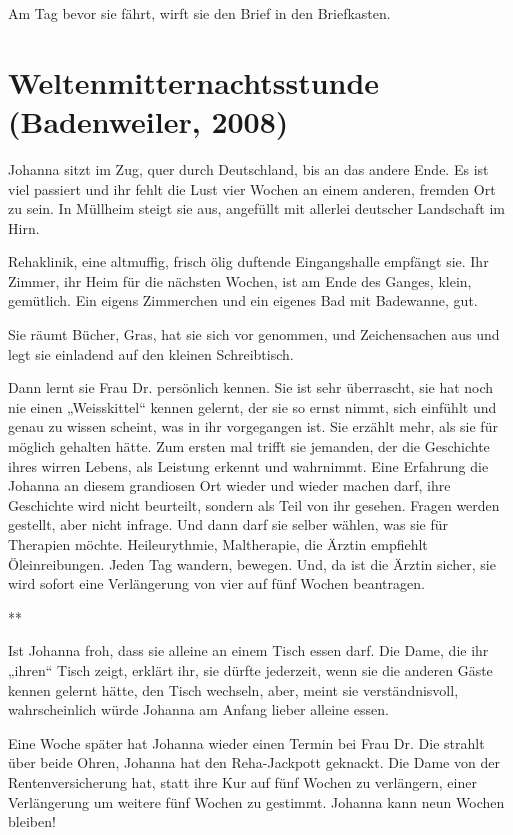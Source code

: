 \documentclass[10pt,titlepage,a5paper]{book}
\newcommand{\sterne}{\par{\centering ***\par}}
\begin{document}
Am Tag bevor sie fährt, wirft sie den Brief in den Briefkasten. 



\section*{ Weltenmitternachtsstunde (Badenweiler, 2008)}



Johanna sitzt im Zug, quer durch Deutschland, bis an das andere Ende. Es ist viel passiert und ihr fehlt die Lust vier Wochen an einem anderen, fremden Ort zu sein. In Müllheim steigt sie aus, angefüllt mit allerlei deutscher Landschaft im Hirn.

Rehaklinik, eine altmuffig, frisch ölig duftende Eingangshalle em\-pfängt sie. Ihr Zimmer, ihr Heim für die nächsten Wochen, ist am Ende des Ganges, klein, gemütlich. Ein eigens Zimmerchen und ein eigenes Bad mit Badewanne, gut.

Sie räumt Bücher, Gras, hat sie sich vor genommen, und Zeichensachen aus und legt sie einladend auf den kleinen Schreibtisch.

Dann lernt sie Frau Dr. persönlich kennen. Sie ist sehr überrascht, sie hat noch nie einen „Weisskittel“ kennen gelernt, der sie so ernst nimmt, sich einfühlt und genau zu wissen scheint, was in ihr vorgegangen ist. Sie erzählt mehr, als sie für möglich gehalten hätte. Zum ersten mal trifft sie jemanden, der die Geschichte ihres wirren Lebens, als Leistung erkennt und wahrnimmt. Eine Erfahrung die Johanna an diesem grandiosen Ort wieder und wieder machen darf, ihre Geschichte wird nicht beurteilt, sondern als Teil von ihr gesehen. Fragen werden gestellt, aber nicht infrage. Und dann darf sie selber wählen, was sie für Therapien möchte. Heileurythmie, Maltherapie, die Ärztin empfiehlt Öleinreibungen. Jeden Tag wandern, bewegen. Und, da ist die Ärztin sicher, sie wird sofort eine Verlängerung von vier auf fünf Wochen beantragen.

\sterne

Ist Johanna froh, dass sie alleine an einem Tisch essen darf. Die Dame, die ihr „ihren“ Tisch zeigt, erklärt ihr, sie dürfte jederzeit, wenn sie die anderen Gäste kennen gelernt hätte, den Tisch wechseln, aber, meint sie verständnisvoll, wahrscheinlich würde Johanna am Anfang lieber alleine essen.

Eine Woche später hat Johanna wieder einen Termin bei Frau Dr. Die strahlt über beide Ohren, Johanna hat den Reha-Jackpott geknackt. Die Dame von der Rentenversicherung hat, statt ihre Kur auf fünf Wochen zu verlängern, einer Verlängerung um weitere fünf Wochen zu gestimmt. Johanna kann neun Wochen bleiben!
\end{document}
